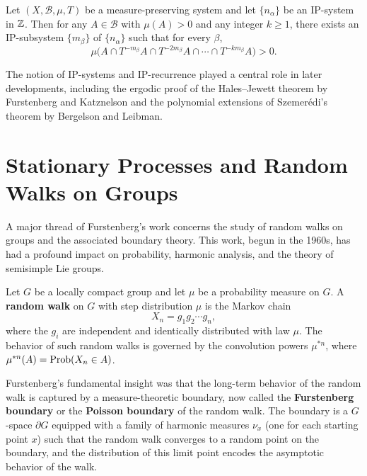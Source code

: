 \begin{theorem}
Let \((X,\mathscr{B},\mu,T)\) be a measure-preserving system and let \(\{n_\alpha\}\) be an IP-system in \(\mathbb{Z}\). Then for any \(A \in \mathscr{B}\) with \(\mu(A) > 0\) and any integer \(k \geq 1\), there exists an IP-subsystem \(\{m_\beta\}\) of \(\{n_\alpha\}\) such that for every \(\beta\),
\[
\mu\bigl(A \cap T^{-m_\beta}A \cap T^{-2m_\beta}A \cap \cdots \cap T^{-km_\beta}A\bigr) > 0.
\]
\end{theorem}

The notion of IP-systems and IP-recurrence played a central role in later developments, including the ergodic proof of the Hales--Jewett theorem by Furstenberg and Katznelson and the polynomial extensions of Szemer\'edi's theorem by Bergelson and Leibman.

\section{Stationary Processes and Random Walks on Groups}

A major thread of Furstenberg's work concerns the study of random walks on groups and the associated boundary theory. This work, begun in the 1960s, has had a profound impact on probability, harmonic analysis, and the theory of semisimple Lie groups.

Let \(G\) be a locally compact group and let \(\mu\) be a probability measure on \(G\). A \textbf{random walk} on \(G\) with step distribution \(\mu\) is the Markov chain
\[
X_n = g_1 g_2 \cdots g_n,
\]
where the \(g_i\) are independent and identically distributed with law \(\mu\). The behavior of such random walks is governed by the convolution powers \(\mu^{*n}\), where \(\mu^{*n}(A) = \operatorname{Prob}(X_n \in A)\).

Furstenberg's fundamental insight was that the long-term behavior of the random walk is captured by a measure-theoretic boundary, now called the \textbf{Furstenberg boundary} or the \textbf{Poisson boundary} of the random walk. The boundary is a \(G\)-space \(\partial G\) equipped with a family of harmonic measures \(\nu_x\) (one for each starting point \(x\)) such that the random walk converges to a random point on the boundary, and the distribution of this limit point encodes the asymptotic behavior of the walk.

